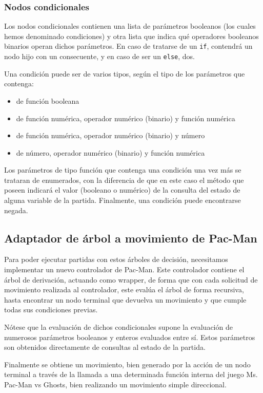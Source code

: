 \subsubsection{Nodos condicionales}
Los nodos condicionales contienen una lista de parámetros booleanos (los cuales hemos denominado condiciones) y otra lista que indica qué operadores booleanos binarios operan dichos parámetros. En caso de tratarse de un \texttt{if}, contendrá un nodo hijo con un consecuente, y en caso de ser un \texttt{else}, dos.
 
Una condición puede ser de varios tipos, según el tipo de los parámetros que contenga:
\begin{itemize}
\item de función booleana
\item de función numérica, operador numérico (binario) y función numérica
\item de función numérica, operador numérico (binario) y número
\item de número, operador numérico (binario) y función numérica
\end{itemize}

Los parámetros de tipo función que contenga una condición una vez más se trataran de enumerados, con la diferencia de que en este caso el método que poseen indicará el valor (booleano o numérico) de la consulta del estado de alguna variable de la partida. Finalmente, una condición puede encontrarse negada.

\subsection{Adaptador de árbol a movimiento de Pac-Man}
Para poder ejecutar partidas con estos árboles de decisión, necesitamos implementar un nuevo controlador de Pac-Man. Este controlador contiene el árbol de derivación, actuando como wrapper, de forma que con cada solicitud de movimiento realizada al controlador, este evalúa el árbol de forma recursiva, hasta encontrar un nodo terminal que devuelva un movimiento y que cumple todas sus condiciones previas.

Nótese  que la evaluación de dichos condicionales supone la evaluación de numerosos parámetros booleanos y enteros evaluados entre sí. Estos parámetros son obtenidos directamente de consultas al estado de la partida.

Finalmente se obtiene un movimiento, bien generado por la acción de un nodo terminal a través de la llamada a una determinada función interna del juego Ms. Pac-Man vs Ghosts, bien realizando un movimiento simple direccional.

